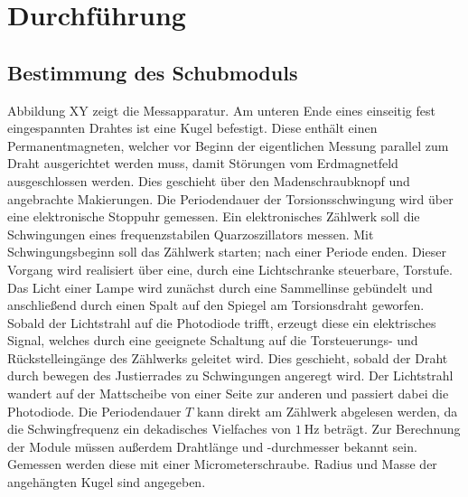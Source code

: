 \section{Durchführung}
\label{sec:Durchfuehrung}
\subsection{Bestimmung des Schubmoduls}

Abbildung XY zeigt die Messapparatur. 
Am unteren Ende eines einseitig fest eingespannten Drahtes ist eine Kugel befestigt. 
Diese enthält einen Permanentmagneten, welcher vor Beginn der eigentlichen Messung parallel zum Draht ausgerichtet werden muss, damit Störungen vom Erdmagnetfeld ausgeschlossen werden. 
Dies geschieht über den Madenschraubknopf und angebrachte Makierungen.
Die Periodendauer der Torsionsschwingung wird über eine elektronische Stoppuhr gemessen. 
Ein elektronisches Zählwerk soll die Schwingungen eines frequenzstabilen Quarzoszillators messen. 
Mit Schwingungsbeginn soll das Zählwerk starten; nach einer Periode enden. 
Dieser Vorgang wird realisiert über eine, durch eine Lichtschranke steuerbare, Torstufe. 
Das Licht einer Lampe wird zunächst durch eine Sammellinse gebündelt und anschließend durch einen Spalt auf den Spiegel am Torsionsdraht geworfen. 
Sobald der Lichtstrahl auf die Photodiode trifft, erzeugt diese ein elektrisches Signal, welches durch eine geeignete Schaltung auf die Torsteuerungs- und Rückstelleingänge des Zählwerks geleitet wird.
Dies geschieht, sobald der Draht durch bewegen des Justierrades zu Schwingungen angeregt wird. 
Der Lichtstrahl wandert auf der Mattscheibe von einer Seite zur anderen und passiert dabei die Photodiode. 
Die Periodendauer $T$ kann direkt am Zählwerk abgelesen werden, da die Schwingfrequenz ein dekadisches Vielfaches von $\SI{1}{\hertz}$ beträgt.
Zur Berechnung der Module müssen außerdem Drahtlänge und -durchmesser bekannt sein. Gemessen werden diese mit einer Micrometerschraube.
 Radius und Masse der angehängten Kugel sind angegeben.
